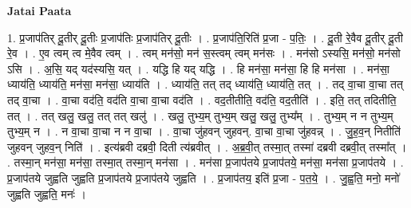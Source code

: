 \documentclass[17pt]{extarticle}
\begin{document}
\textbf{Jatai Paata} \newline

1. प्र॒जाप॑तिर् दू॒तीर् दू॒तीः प्र॒जाप॑तिः प्र॒जाप॑तिर् दू॒तीः । . प्र॒जाप॑ति॒रिति॑ प्र॒जा - प॒तिः॒ । . दू॒ती रे॒वैव दू॒तीर् दू॒ती रे॒व । . ए॒व त्वम् त्व मे॒वैव त्वम् । . त्वम् मन॑सो॒ मन॑ स॒स्त्वम् त्वम् मन॑सः । . मन॑सो ऽस्यसि॒ मन॑सो॒ मन॑सो ऽसि । . अ॒सि॒ यद् यद॑स्यसि॒ यत् । . यद्धि हि यद् यद्धि । . हि मन॑सा॒ मन॑सा॒ हि हि मन॑सा । . मन॑सा॒ ध्याय॑ति॒ ध्याय॑ति॒ मन॑सा॒ मन॑सा॒ ध्याय॑ति । . ध्याय॑ति॒ तत् तद् ध्याय॑ति॒ ध्याय॑ति॒ तत् । . तद् वा॒चा वा॒चा तत् तद् वा॒चा । . वा॒चा वद॑ति॒ वद॑ति वा॒चा वा॒चा वद॑ति । . वद॒तीतीति॒ वद॑ति॒ वद॒तीति॑ । . इति॒ तत् तदितीति॒ तत् । . तत् खलु॒ खलु॒ तत् तत् खलु॑ । . खलु॒ तुभ्य॒म् तुभ्य॒म् खलु॒ खलु॒ तुभ्य᳚म् । . तुभ्य॒म् न न तुभ्य॒म् तुभ्य॒म् न । . न वा॒चा वा॒चा न न वा॒चा । . वा॒चा जु॑हवन् जुहवन्. वा॒चा वा॒चा जु॑हवन्न् । . जु॒ह॒व॒न् नितीति॑ जुहवन् जुहव॒न् निति॑ । . इत्य॑ब्रवी दब्रवी॒ दिती त्य॑ब्रवीत् । . अ॒ब्र॒वी॒त् तस्मा॒त् तस्मा॑ दब्रवी दब्रवी॒त् तस्मा᳚त् । . तस्मा॒न् मन॑सा॒ मन॑सा॒ तस्मा॒त् तस्मा॒न् मन॑सा । . मन॑सा प्र॒जाप॑तये प्र॒जाप॑तये॒ मन॑सा॒ मन॑सा प्र॒जाप॑तये । . प्र॒जाप॑तये जुह्वति जुह्वति प्र॒जाप॑तये प्र॒जाप॑तये जुह्वति । . प्र॒जाप॑तय॒ इति॑ प्र॒जा - प॒त॒ये॒ । . जु॒ह्व॒ति॒ मनो॒ मनो॑ जुह्वति जुह्वति॒ मनः॑ । \newline
\end{document}
